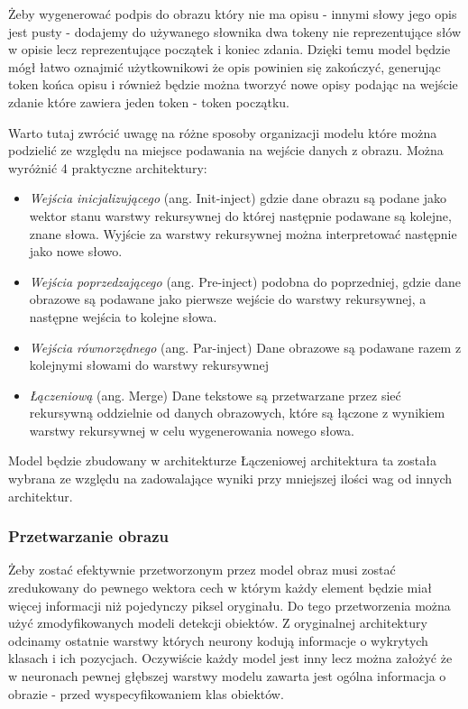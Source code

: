 Żeby wygenerować podpis do obrazu który nie ma opisu - innymi słowy jego opis jest pusty - dodajemy do używanego słownika dwa tokeny nie reprezentujące słów w opisie lecz reprezentujące początek i koniec zdania. Dzięki temu model będzie mógł łatwo oznajmić użytkownikowi że opis powinien się zakończyć, generując token końca opisu i również będzie można tworzyć nowe opisy podając na wejście zdanie które zawiera jeden token - token początku.

Warto tutaj zwrócić uwagę na różne sposoby organizacji modelu które można podzielić ze względu na miejsce podawania na wejście danych z obrazu. Można wyróżnić 4 praktyczne architektury: \cite{rnn-in-captiongen}
\begin{itemize}
	\item \textit{Wejścia inicjalizującego} (ang. Init-inject) gdzie dane obrazu są podane jako wektor stanu warstwy rekursywnej do której następnie podawane są kolejne, znane słowa. Wyjście za warstwy rekursywnej można interpretować następnie jako nowe słowo. 
	\item \textit{Wejścia poprzedzającego} (ang. Pre-inject) podobna do poprzedniej, gdzie dane obrazowe są podawane jako pierwsze wejście do warstwy rekursywnej, a następne wejścia to kolejne słowa.
	\item \textit{Wejścia równorzędnego} (ang. Par-inject) Dane obrazowe są podawane razem z kolejnymi słowami do warstwy rekursywnej
	\item \textit{Łączeniową} (ang. Merge) Dane tekstowe są przetwarzane przez sieć rekursywną oddzielnie od danych obrazowych, które są łączone z wynikiem warstwy rekursywnej w celu wygenerowania nowego słowa.
\end{itemize}


Model będzie zbudowany w architekturze Łączeniowej architektura ta została wybrana ze względu na zadowalające wyniki przy mniejszej ilości wag od innych architektur.\cite[p.~25]{rnn-in-captiongen}
\subsubsection{Przetwarzanie obrazu}
Żeby zostać efektywnie przetworzonym przez model obraz musi zostać zredukowany do pewnego wektora cech w którym każdy element będzie miał więcej informacji niż pojedynczy piksel oryginału. Do tego przetworzenia można użyć zmodyfikowanych modeli detekcji obiektów. Z oryginalnej architektury odcinamy ostatnie warstwy których neurony kodują informacje o wykrytych klasach i ich pozycjach. Oczywiście każdy model jest inny lecz można założyć że w neuronach pewnej głębszej warstwy modelu zawarta jest ogólna informacja o obrazie - przed wyspecyfikowaniem klas obiektów.

